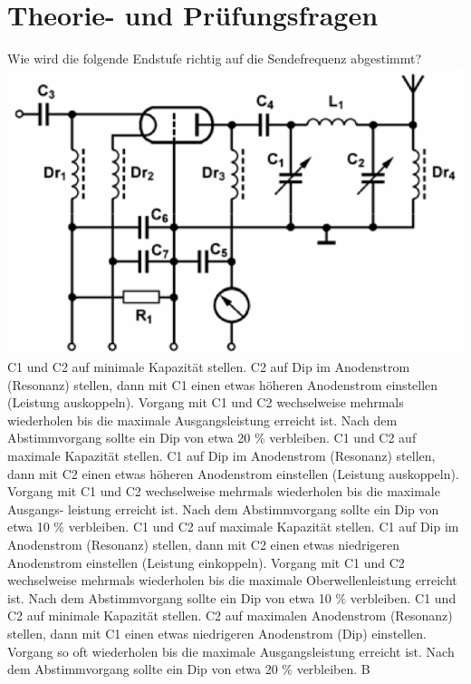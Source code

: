 
\section*{Theorie- und Prüfungsfragen} 


{Wie wird die folgende Endstufe richtig auf die Sendefrequenz abgestimmt?\\ \includegraphics[scale=0.25]{Schaltungstechnik/Bilder/TG313.png}}%
{C1 und C2 auf minimale Kapazität stellen. C2 auf Dip im Anodenstrom (Resonanz) stellen, dann mit C1 einen etwas höheren Anodenstrom einstellen (Leistung auskoppeln). Vorgang mit C1 und C2 wechselweise mehrmals wiederholen bis die maximale Ausgangsleistung erreicht ist. Nach dem Abstimmvorgang sollte ein Dip von etwa 20 $\%$ verbleiben.}%
{C1 und C2 auf maximale Kapazität stellen. C1 auf Dip im Anodenstrom (Resonanz) stellen, dann mit C2 einen etwas höheren Anodenstrom einstellen (Leistung auskoppeln). Vorgang mit C1 und C2 wechselweise mehrmals wiederholen bis die maximale Ausgangs- leistung erreicht ist. Nach dem Abstimmvorgang sollte ein Dip von etwa 10 $\%$ verbleiben.}%
{C1 und C2 auf maximale Kapazität stellen. C1 auf Dip im Anodenstrom (Resonanz) stellen, dann mit C2 einen etwas niedrigeren Anodenstrom einstellen (Leistung einkoppeln). Vorgang mit C1 und C2 wechselweise mehrmals wiederholen bis die maximale Oberwellenleistung erreicht ist. Nach dem Abstimmvorgang sollte ein Dip von etwa 10 $\%$ verbleiben.}%
{C1 und C2 auf minimale Kapazität stellen. C2 auf maximalen Anodenstrom (Resonanz) stellen, dann mit C1 einen etwas niedrigeren Anodenstrom (Dip) einstellen. Vorgang so oft wiederholen bis die maximale Ausgangsleistung erreicht ist. Nach dem Abstimmvorgang sollte ein Dip von etwa 20 $\%$ verbleiben.}%
{B}%

